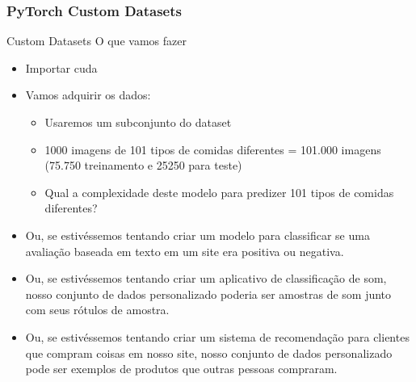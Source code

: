 \documentclass{beamer}
\begin{document}
\begin{frame}
	\frametitle{PyTorch Custom Datasets}
	\begin{block}{Custom Datasets}
		O que vamos fazer
		\begin{itemize}
			\item Importar cuda
			\item Vamos adquirir os dados:
			\begin{itemize}
				\item Usaremos um subconjunto do dataset \href{https://data.vision.ee.ethz.ch/cvl/datasets_extra/food-101/}{} 
				\item 1000 imagens de 101 tipos de comidas diferentes = 101.000 imagens (75.750 treinamento e 25250 para teste)
				\item Qual a complexidade deste modelo para predizer 101 tipos de comidas diferentes?
			\end{itemize}
			\item Ou, se estivéssemos tentando criar um modelo para classificar se uma avaliação baseada em texto em um site era positiva ou negativa.
			\item Ou, se estivéssemos tentando criar um aplicativo de classificação de som, nosso conjunto de dados personalizado poderia ser amostras de som junto com seus rótulos de amostra.
			\item Ou, se estivéssemos tentando criar um sistema de recomendação para clientes que compram coisas em nosso site, nosso conjunto de dados personalizado pode ser exemplos de produtos que outras pessoas compraram.
		\end{itemize}
	\end{block}
\end{frame}

\end{document}
